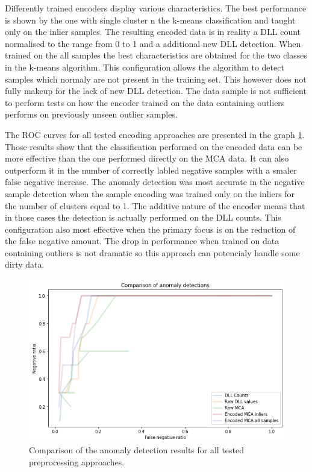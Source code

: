 \documentclass[a4paper,twoside,12pt]{book}
\begin{document}
Differently trained encoders display various characteristics. The best performance is shown by
the one with single cluster n the k-means classification and taught only on the inlier samples.
The resulting encoded data is in reality a DLL count normalised to the range from 0 to 1 and a
additional new DLL detection. When trained on the all samples the best characteristics are 
obtained for the two classes in the k-means algorithm. This configuration allows the algorithm
to detect samples which normaly are not present in the training set. This however does not 
fully makeup for the lack of new DLL detection. The data sample is not sufficient to perform
tests on how the encoder trained on the data containing outliers performs on previously unseen
outlier samples.

The ROC curves for all tested encoding approaches are presented in the graph \ref{fig:GraphComp}.
Those results show that the classification performed on the encoded data can be more effective
than the one performed directly on the MCA data. It can also outperform it in the number of 
correctly labled negative samples with a smaler false negative increase. The anomaly 
detection was most accurate in the negative sample detection when the sample encoding was trained only on the inliers
for the number of clusters equal to 1. The additive nature of the encoder means that in those cases the 
detection is actually performed on the DLL counts. This configuration also most effective 
when the primary focus is on the reduction of the false negative amount. The drop in performance when 
trained on data containing outliers is not dramatic so this approach can potencialy handle some 
dirty data.

\begin{figure}
	\centering
	\includegraphics[scale=0.9]{images/DLLCompGraphKF.PNG}
	\caption{Comparison of the anomaly detection results for all tested preprocessing approaches.}
	\label{fig:GraphComp}
 \end{figure}
\end{document}
